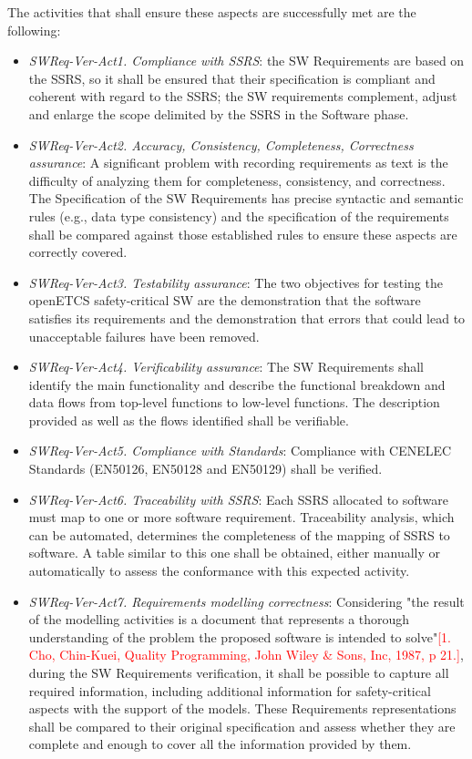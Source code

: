 \documentclass{template/openetcs_report}
\begin{document}
The activities that shall ensure these aspects are successfully met are the following:
\begin{itemize}
\item {\it SWReq-Ver-Act1. Compliance with SSRS}: the SW Requirements are based on the SSRS, so it shall be ensured that their specification is compliant and coherent with regard to the SSRS; the SW requirements complement, adjust and enlarge the scope delimited by the SSRS in the Software phase.
\item {\it SWReq-Ver-Act2. Accuracy, Consistency, Completeness, Correctness assurance}: A significant problem with recording requirements as text is the difficulty of analyzing them for completeness, consistency, and correctness. The Specification of the SW Requirements has precise syntactic and semantic rules (e.g., data type consistency) and the specification of the requirements shall be compared against those established rules to ensure these aspects are correctly covered.
\item {\it SWReq-Ver-Act3. Testability assurance}: The two objectives for testing the openETCS safety-critical SW are the demonstration that the software satisfies its requirements and the demonstration that errors that could lead to unacceptable failures have been removed.
\item {\it SWReq-Ver-Act4. Verificability assurance}: The SW Requirements shall identify the main functionality and describe the functional breakdown and data flows from top-level functions to low-level functions. The description provided as well as the flows identified shall be verifiable.
\item {\it SWReq-Ver-Act5. Compliance with Standards}: Compliance with CENELEC Standards (EN50126, EN50128 and EN50129) shall be verified.
\item {\it SWReq-Ver-Act6. Traceability with SSRS}: Each SSRS allocated to software must map to one or more software requirement. Traceability analysis, which can be automated, determines the completeness of the mapping of SSRS to software. A table similar to this one shall be obtained, either manually or automatically to assess the conformance with this expected activity.
\item {\it SWReq-Ver-Act7. Requirements modelling correctness}: Considering  "the result of the modelling activities is a document that represents a thorough understanding of the problem the proposed software is intended to solve"\textcolor{red}{[1. Cho, Chin-Kuei, Quality Programming, John Wiley \& Sons, Inc, 1987, p 21.]}, during the SW Requirements verification, it shall be possible to capture all required information, including additional information for safety-critical aspects with the support of the models. These Requirements representations shall be compared to their original specification and assess whether they are complete and enough to cover all the information provided by them.
\end{itemize}
\end{document}
